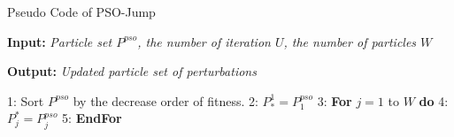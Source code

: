\documentclass[lettersize,journal]{IEEEtran}
\begin{document}
	
	
	\begin{algorithm}[tb] 
		\caption{Pseudo Code of PSO-Jump}
		\begin{small}
			{\large \textbf{Input:}} \emph{Particle set $P^{pso}$, the number of iteration $U$, the number of particles $W$}
			
			{\large \textbf{Output:}} \emph{Updated particle set of perturbations}
			
			\begin{algorithmic}[0]
				\STATE \hspace{-0.3cm} {\small 1:} \hspace{-0.05cm}  \hspace{0.0cm} Sort $P^{pso}$ by the decrease order of fitness. 
				\STATE \hspace{-0.3cm} {\small 2:} \hspace{-0.05cm}  \hspace{0.0cm} $P^1_\ast=P^{pso}_1$ %
				\STATE \hspace{-0.3cm} {\small 3:} \hspace{-0.05cm}  \hspace{0.0cm} \textbf{For} $j=1$ to $W$ \textbf{do}
				\STATE \hspace{-0.3cm} {\small 4:} \hspace{-0.05cm}  \hspace{0.25cm} $P^\ast_j=P^{pso}_j$ %
				\STATE \hspace{-0.3cm} {\small 5:} \hspace{-0.05cm}  \hspace{0.0cm} \textbf{EndFor}
				

\end{algorithmic}
\end{small}
\end{algorithm}
\end{document}
